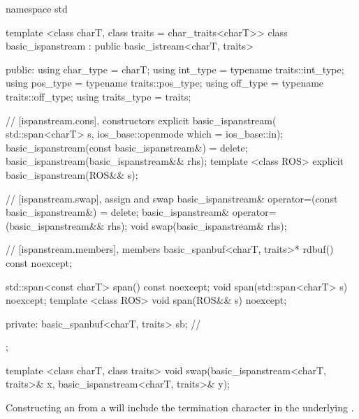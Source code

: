 \documentclass[ebook,11pt,article]{memoir}
\renewcommand{\iref}[1]{[#1]}
\begin{document}
\begin{codeblock}
namespace std {
  template <class charT, class traits = char_traits<charT>>
  class basic_ispanstream
    : public basic_istream<charT, traits> {
  public:
    using char_type      = charT;
    using int_type       = typename traits::int_type;
    using pos_type       = typename traits::pos_type;
    using off_type       = typename traits::off_type;
    using traits_type    = traits;

    // \iref{ispanstream.cons}, constructors
    explicit basic_ispanstream(
      std::span<charT> s,
      ios_base::openmode which = ios_base::in);
    basic_ispanstream(const basic_ispanstream&) = delete;
    basic_ispanstream(basic_ispanstream&& rhs);
    template <class ROS>
    explicit basic_ispanstream(ROS&& s);

    // \iref{ispanstream.swap}, assign and swap
    basic_ispanstream& operator=(const basic_ispanstream&) = delete;
    basic_ispanstream& operator=(basic_ispanstream&& rhs);
    void swap(basic_ispanstream& rhs);

    // \iref{ispanstream.members}, members
    basic_spanbuf<charT, traits>* rdbuf() const noexcept;

    std::span<const charT> span() const noexcept;
    void span(std::span<charT> s) noexcept;
    template <class ROS>
    void span(ROS&& s) noexcept;
    
  private:
    basic_spanbuf<charT, traits> sb; // \expos
  };

  template <class charT, class traits>
    void swap(basic_ispanstream<charT, traits>& x,
              basic_ispanstream<charT, traits>& y);
}
\end{codeblock}






\pnum
\begin{note}
Constructing an  from a  will include the termination character  in the underlying .
\end{note}
\end{document}
